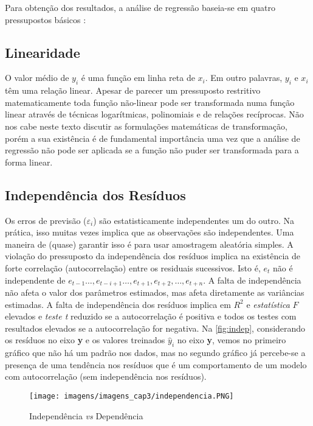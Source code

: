 Para obtenção dos resultados, a análise de regressão baseia-se em quatro pressupostos básicos :

\subsection{Linearidade}

\noindent O valor médio de  $y_i$ é uma função em linha reta de $x_i$. Em outro palavras, $y_i$ e $x_i$ têm uma relação linear. Apesar de parecer um pressuposto restritivo matematicamente toda função não-linear pode ser transformada numa função linear através de técnicas logarítmicas, polinomiais e de relações recíprocas. Não nos cabe neste texto discutir as formulações matemáticas de transformação, porém a sua existência é de fundamental importância uma vez que a análise de regressão não pode ser aplicada se a função não puder ser transformada para a forma linear.

\subsection{Independência dos Resíduos}

\noindent Os erros de previsão ($\varepsilon_i$) são estatisticamente independentes um do outro. Na prática, isso muitas vezes implica que as observações são independentes. Uma maneira de (quase) garantir isso é para usar amostragem aleatória simples.
A violação do pressuposto da independência dos resíduos implica na existência de forte correlação (autocorrelação) entre os residuais sucessivos. Isto é, $e_t$ não é independente de $e_{t-1} \dots, e_{t-i+1} \dots, e_{t+1}, e_{t+2}, \dots, e_{t+n}$. A falta de independência não afeta o valor dos parâmetros estimados, mas afeta diretamente as variâncias estimadas. A falta de independência dos resíduos implica em $R^2$ e \textit{estatística} $F$ elevados e \textit{teste t} reduzido se a autocorrelação é positiva e todos os testes com resultados elevados se a autocorrelação for negativa. Na \autoref{fig:indep}, considerando os resíduos no eixo \textbf{y} e os valores treinados $\hat{y}_i$ no eixo \textbf{y}, vemos no primeiro gráfico que não há um padrão nos dados, mas no segundo gráfico já percebe-se a presença de uma tendência nos resíduos que é um comportamento de um modelo com autocorrelação (sem independência nos resíduos).

\begin{figure}[H]
\centering
\caption{Independência \textit{vs} Dependência}
\texttt{[image: imagens/imagens\_cap3/independencia.PNG]}
\label{fig:indep}
\end{figure}

